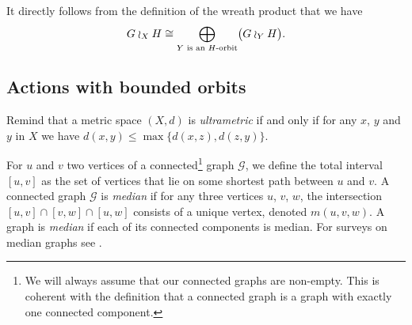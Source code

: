 \documentclass[a4paper]{article}
\theoremstyle{definition}
\theoremstyle{remark}%
\begin{document}
It directly follows from the definition of the wreath product that we have
\[
	G\wr_XH\cong\bigoplus_{Y\textnormal{ is an $H$-orbit}}\bigl(G\wr_YH\bigr).
\]
%
%
%
%
%
%
%
%
%
%
\subsection{Actions with bounded orbits}
%
%
%
Remind that a metric space $(X,d)$ is \emph{ultrametric} if and only if for any $x$, $y$ and $y$ in $X$ we have $d(x,y)\leq\max\{d(x,z),d(z,y)\}$.

For $u$ and $v$ two vertices of a connected\footnote{We will always assume that our connected graphs are non-empty. This is coherent with the definition that a connected graph is a graph with exactly one connected component.} graph $\mathcal G$, we define the total interval $[u,v]$ as the set of vertices that lie on some shortest path between $u$ and $v$.
A connected graph $\mathcal G$ is \emph{median} if for any three vertices $u$, $v$, $w$, the intersection $[u,v]\cap[v,w]\cap[u,w]$ consists of a unique vertex, denoted $m(u,v,w)$.
A graph is \emph{median} if each of its connected components is median. For surveys on median graphs see \cite{MR1705337,MR2405677}.
\end{document}
